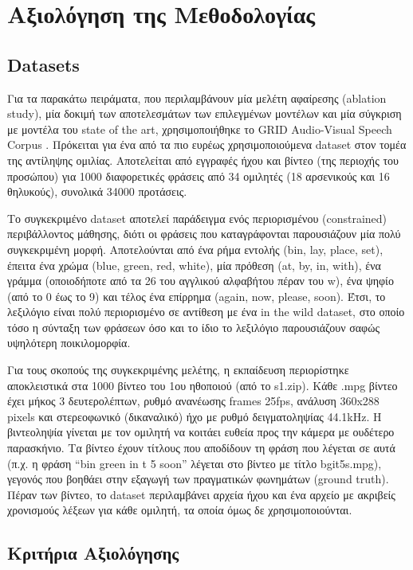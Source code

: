 \section{Αξιολόγηση της Μεθοδολογίας}
\label{Evaluation}

\subsection{Datasets}
\label{Datasets}
Για τα παρακάτω πειράματα, που περιλαμβάνουν μία μελέτη αφαίρεσης (ablation study), μία δοκιμή των αποτελεσμάτων των επιλεγμένων μοντέλων και μία σύγκριση με μοντέλα του state of the art, χρησιμοποιήθηκε το GRID Audio-Visual Speech Corpus \cite{cooke_2006_3625687}. Πρόκειται για ένα από τα πιο ευρέως χρησιμοποιούμενα dataset στον τομέα της αντίληψης ομιλίας. Αποτελείται από εγγραφές ήχου και βίντεο (της περιοχής του προσώπου) για 1000 διαφορετικές φράσεις από 34 ομιλητές (18 αρσενικούς και 16 θηλυκούς), συνολικά 34000 προτάσεις. 

Το συγκεκριμένο dataset αποτελεί παράδειγμα ενός περιορισμένου (constrained) περιβάλλοντος μάθησης, διότι οι φράσεις που καταγράφονται παρουσιάζουν μία πολύ συγκεκριμένη μορφή. Απο\-τε\-λού\-νται από ένα ρήμα εντολής (bin, lay, place, set), έπειτα ένα χρώμα (blue, green, red, white), μία πρόθεση (at, by, in, with), ένα γράμμα (οποιοδήποτε από τα 26 του αγγλικού αλφαβήτου πέραν του w), ένα ψηφίο (από το 0 έως το 9) και τέλος ένα επίρρημα (again, now, please, soon). Έτσι, το λεξιλόγιο είναι πολύ περιορισμένο σε αντίθεση με ένα in the wild dataset, στο οποίο τόσο η σύνταξη των φράσεων όσο και το ίδιο το λεξιλόγιο παρουσιάζουν σαφώς υψηλότερη ποικιλομορφία.

Για τους σκοπούς της συγκεκριμένης μελέτης, η εκπαίδευση περιορίστηκε αποκλειστικά στα 1000 βίντεο του 1ου ηθοποιού (από το s1.zip). Κάθε .mpg βίντεο έχει μήκος 3 δευτερολέπτων, ρυθμό α\-να\-νέ\-ω\-σης frames 25fps, ανάλυση 360x288 pixels και στερεοφωνικό (δικαναλικό) ήχο με ρυθμό δειγματοληψίας 44.1kHz. Η βιντεοληψία γίνεται με τον ομιλητή να κοιτάει ευθεία προς την κάμερα με ουδέτερο παρασκήνιο. Τα βίντεο έχουν τίτλους που αποδίδουν τη φράση που λέγεται σε αυτά (π.χ. η φράση ``bin green in t 5 soon'' λέγεται στο βίντεο με τίτλο bgit5s.mpg), γεγονός που βοηθάει στην εξαγωγή των πραγματικών φωνημάτων (ground truth). Πέραν των βίντεο, το dataset περιλαμβάνει αρχεία ήχου και ένα αρχείο με ακριβείς χρονισμούς λέξεων για κάθε ομιλητή, τα οποία όμως δε χρησιμοποιούνται.

\subsection{Κριτήρια Αξιολόγησης}
\label{Criteria}

